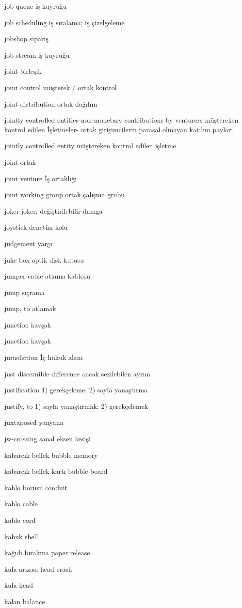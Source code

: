 \documentclass[12pt,fleqn]{article}\usepackage{../../common}
\begin{document}
job queue iş kuyruğu

job scheduling iş sıralama; iş çizelgeleme

jobshop sipariş

job stream iş kuyruğu

joint birleşik

joint control müşterek / ortak kontrol

joint distribution ortak dağılım

jointly controlled entities-non-monetary contributions by venturers müştereken kontrol edilen İşletmeler- ortak girişimcilerin parasal olmayan katılım payları 

jointly controlled entity müştereken kontrol edilen işletme

joint ortak

joint venture İş ortaklığı

joint working group ortak çalışma grubu

joker joker; değiştirilebilir damga

joystick denetim kolu

judgement yargı

juke box optik disk kutusu

jumper cable atlama kablosu

jump sıçrama

jump, to atlamak

junction kavşak

junction kavşak

jurisdiction İç hukuk alanı

just discernible difference ancak sezilebilen ayrım

justification 1) gerekçeleme, 2) sayfa yanaştırma

justify, to 1) sayfa yanaştırmak; 2) gerekçelemek

juxtaposed yanyana

jw-crossing sanal eksen kesişi

kabarcık bellek bubble memory

kabarcık bellek kartı bubble board

kablo borusu conduit

kablo cable

kablo cord

kabuk shell

kağıdı bırakma paper release

kafa arızası head crash

kafa head

kalan balance
\end{document}
